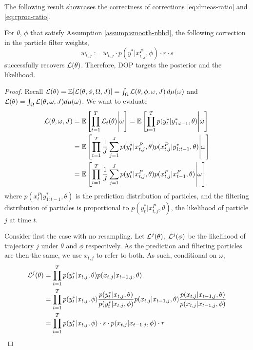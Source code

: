 \documentclass{article}
\begin{document}
The following result showcases the correctness of corrections \ref{eq:dmeas-ratio} and \ref{eq:rproc-ratio}.

\begin{lem}
    For $\theta$, $\phi$ that satisfy Assumption \ref{assump:smooth-nbhd}, the following correction in the particle filter weights,
    \begin{equation}
        w_{t,j} := \tilde{w}_{t,j} \cdot p(y^*|x_{t,j}^P,\phi)\cdot r \cdot s
    \end{equation}
    successfully recovers $\mathcal{L}(\theta)$. Therefore, DOP targets the posterior and the likelihood.
\end{lem}

\begin{proof}
    Recall $\mathcal{L}(\theta) = \mathbb{E}[\mathcal{L}(\theta,\phi,\Omega, J)]=\int_\Omega \mathcal{L}(\theta,\phi,\omega, J)\, d\mu(\omega)$ and $\mathcal{L}(\theta) = \int_\Omega \mathcal{L}(\theta, \omega, J) d\mu(\omega)$. We want to evaluate
    \begin{align*}
        \mathcal{L}(\theta,\omega, J)
        &= \mathbb{E}\left[ \prod_{t=1}^T \mathcal{L}_t(\theta) \middle| \omega\right]
        = \mathbb{E}\left[ \prod_{t=1}^T p(y_t^*|y_{1:t-1}^*,\theta) \middle| \omega\right] \\
        &= \mathbb{E}\left[ \prod_{t=1}^T \frac{1}{J} \sum_{j=1}^J  p(y_t^*|x_{t,j}^P,\theta) p(x_{t,j}^P|y_{1:t-1}^*,\theta) \middle| \omega\right] \\
        &= \mathbb{E}\left[ \prod_{t=1}^T\frac{1}{J}  \sum_{j=1}^J  p(y_t^*|x_{t,j}^P,\theta) p(x_{t,j}^P|x_{t-1}^F,\theta) \middle| \omega\right] 
    \end{align*}
    where $p(x_t^P|y_{1:t-1}^*,\theta)$ is the prediction distribution of particles, and the filtering distribution of particles is proportional to $p(y_t^*|x_{t,j}^P,\theta)$, the likelihood of particle $j$ at time $t$.
    
    Consider first the case with no resampling. Let $\mathcal{L}^j(\theta)$, $\mathcal{L}^j(\phi)$ be the likelihood of trajectory $j$ under $\theta$ and $\phi$ respectively. As the prediction and filtering particles are then the same, we use $x_{t,j}$ to refer to both. As such, conditional on $\omega$,
    \begin{align*}
        \mathcal{L}^j(\theta) 
        &= \prod_{t=1}^T p(y_t^*|x_{t,j}, \theta) p(x_{t,j}|x_{t-1,j}, \theta) \\
        &= \prod_{t=1}^T p(y_t^*|x_{t,j}, \phi) \frac{p(y_t^*|x_{t,j}, \theta)}{p(y_t^*|x_{t,j}, \phi)} p(x_{t,j}|x_{t-1,j}, \theta) \frac{p(x_{t,j}|x_{t-1,j}, \theta) }{p(x_{t,j}|x_{t-1,j}, \phi) } \\
        &= \prod_{t=1}^T p(y_t^*|x_{t,j}, \phi) \cdot s \cdot p(x_{t,j}|x_{t-1,j}, \phi)\cdot r
    \end{align*}
    

\end{proof}
\end{document}
